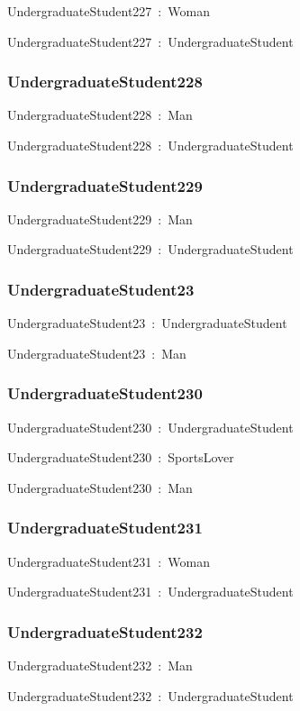 \documentclass{article}
\begin{document}
UndergraduateStudent227~:~Woman

UndergraduateStudent227~:~UndergraduateStudent

\subsubsection*{UndergraduateStudent228}

UndergraduateStudent228~:~Man

UndergraduateStudent228~:~UndergraduateStudent

\subsubsection*{UndergraduateStudent229}

UndergraduateStudent229~:~Man

UndergraduateStudent229~:~UndergraduateStudent

\subsubsection*{UndergraduateStudent23}

UndergraduateStudent23~:~UndergraduateStudent

UndergraduateStudent23~:~Man

\subsubsection*{UndergraduateStudent230}

UndergraduateStudent230~:~UndergraduateStudent

UndergraduateStudent230~:~SportsLover

UndergraduateStudent230~:~Man

\subsubsection*{UndergraduateStudent231}

UndergraduateStudent231~:~Woman

UndergraduateStudent231~:~UndergraduateStudent

\subsubsection*{UndergraduateStudent232}

UndergraduateStudent232~:~Man

UndergraduateStudent232~:~UndergraduateStudent
\end{document}
